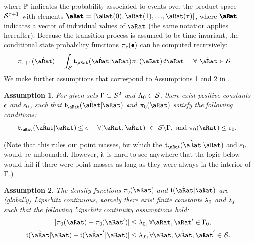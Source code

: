 \documentclass[\econtexRoot/BufferStockTheory.tex]{subfiles}
\begin{document}
where $\mathbb{P}$ indicates the probability associated to events over the product space $\mathcal{S}^{\tau+1}$ with elements $\vctr{\pnt}=[\pnt(0),\pnt(1),{\dots},\pnt(\tAbs)]$, where $\vctr{\pnt}$ indicates a vector of individual values of $\pnt$ (the same notation applies hereafter).
Because the transition process is assumed to be time invariant, the conditional state probability functions $\pi_{\tau}(\bullet)$ can be computed recursively:
\begin{align}
  \DnsPnt_{\tAbs+1}(\Nxt{\pnt}) &= \int_{\SetFullCnts} \DnsPntNxtFmPntNow_{\pnt}(\Nxt{\pnt}|\pnt)\DnsPnt_{\tAbs}(\pnt)d\pnt ~~~~ \forall~\Nxt{\pnt} \in \SetFullCnts \label{eq:stateDensity}
\end{align}
We make further assumptions that correspond to Assumptions 1 and 2 in \cite{saDiscrete}.
\theoremstyle{plain}
\newtheorem{assumption}{Assumption}
\begin{assumption}\label{assn:Bounded} For given sets $\Gamma \subset \mathcal{S}^{2}$ and $\Lambda_{0} \subset \mathcal{S}$, there exist positive constants $\epsilon$ and $\varepsilon_{0}$, such that $\DnsPntNxtFmPntNow_{\pnt}(\Nxt{\pnt}|\pnt) $ and $\DnsPnt_{0}(\pnt)$ satisfy the following conditions:
  \begin{align}
    \DnsPntNxtFmPntNow_{\pnt}(\Nxt{\pnt}|\pnt) \leq \DnsSetNxtFmPntNowBnd ~~~~\forall(\pnt,\Nxt{\pnt})~\in~\SetFullCnts \backslash \KrnPntNxtFmPntNowSetSprtTrnc, \text{~and~} \DnsPnt_{0}(\pnt) \leq \DnsPntBnd_{0}.
  \end{align}
\end{assumption}
(Note that this rules out point masses, for which the $\DnsPntNxtFmPntNow_{\pnt}(\Nxt{\pnt}|\pnt)$ and $\varepsilon_{0}$ would be unbounded.  However, it is hard to see anywhere that the logic below would fail if there were point masses as long as they were always in the interior of $\Gamma$.)
\begin{assumption}\label{assn:Lipschitz} The density functions $\DnsPnt_{0}(\pnt)$ and $\DnsPntNxtFmPntNow(\Nxt{\pnt}|\pnt)$ are (globally) Lipschitz continuous, namely there exist finite constants $\lambda_{0}$ and $\lambda_{f}$ such that the following Lipschitz continuity assumptions hold:
  \begin{align}
    |\DnsPnt_{0}(\pnt)-\DnsPnt_{0}(\pnt^{\prime})| & \leq \LipschitzDnsPntBnd, \forall \pnt,\pnt^{\prime}\in\KrnPntNxtFmPntNowSetSprtTrnc_{0}, \label{eq:LipCont}
    \\    |\DnsSetNxtFmPntNow(\Nxt{\pnt}|\pnt)-\DnsSetNxtFmPntNow(\Nxt{\pnt}^{\prime}|\pnt)| & \leq \LipschitzDnsPntNxtBnd, \forall \pnt,\Nxt{\pnt},\Nxt{\pnt}^{\prime}\in \SetFullCnts.    \notag
  \end{align}
\end{assumption}
\end{document}
